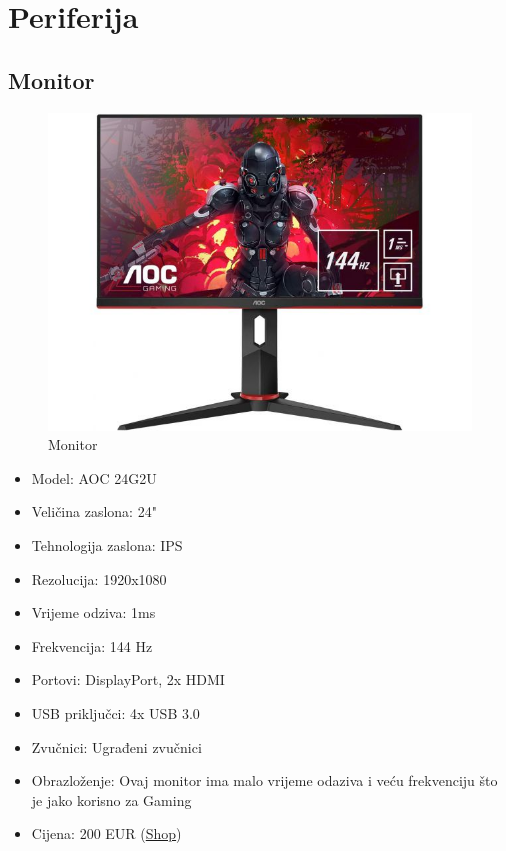\documentclass{article}
\begin{document}
\pagebreak

\section{Periferija}

\subsection{Monitor}
\begin{figure}[H]
    \centering
    \includegraphics[width = \textwidth]{Slike/Monitor.jpg}
    \caption{Monitor}
    \label{Slika:monitor}
\end{figure}
\begin{itemize}
    \item Model: AOC 24G2U
    \item Veličina zaslona: 24"
    \item Tehnologija zaslona: IPS 
    \item Rezolucija: 1920x1080 
    \item Vrijeme odziva: 1ms
    \item Frekvencija: 144 Hz
    \item Portovi: DisplayPort, 2x HDMI
    \item USB priključci: 4x USB 3.0
    \item Zvučnici: Ugrađeni zvučnici
    \item Obrazloženje: Ovaj monitor ima malo vrijeme odaziva i veću frekvenciju što je jako korisno za Gaming
    \item Cijena: 200 EUR (\href{https://www.hgspot.hr/monitor-aoc-24g2u-24-ips-fhd-1920x1080px-1ms-144-hz-dp-2x-hdmi-amd-freesync-4x-usb3-0-zvucnici}{Shop})
\end{itemize}
\end{document}
